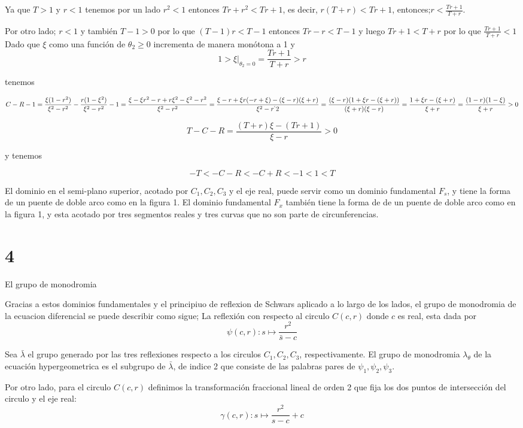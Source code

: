 \documentclass[11pt]{report}
\theoremstyle{definition}
\theoremstyle{remark}
\begin{document}
Ya que $T>1$ y $r <1$ tenemos por un lado $r^{2}<1$ entonces $Tr + r^{2} < Tr + 1$, es decir, $r(T+r)< Tr +1$, entonces;$r<\frac{Tr + 1}{T+r}$.

Por otro lado; $r<1$ y tambi\'en $T-1>0$ por lo que $(T-1)r < T-1$ entonces $Tr-r < T-1$ y luego $Tr +1 < T+r$ por lo que $\frac{Tr +1}{T +r} < 1$
Dado que $\xi $ como una funci\'on de $\theta_{2} \geq 0$ incrementa de manera mon\'otona a 1 y $$1 > \xi |_{\theta_{2} =0} = \frac{Tr+1}{T+r} > r $$

tenemos

$$C-R-1 =\frac{\xi(1-r^{2})}{\xi^{2}-r^{2}} - \frac{r(1-\xi^{2})}{\xi^{2}-r^{2}}-1= \frac{\xi-\xi r^{2} -r + r\xi^{2}-\xi^{2} - r^{2}}{\xi^{2} - r^{2}}= \frac{\xi-r + \xi r(-r + \xi)-(\xi -r)(\xi + r)}{ \xi^{2} - r^`{2}}= \frac{(\xi -r)(1 + \xi r - (\xi +r))}{(\xi +r)(\xi -r)}=\frac{1 + \xi r -(\xi +r)}{\xi +r}=\frac{(1-r)(1-\xi)}{\xi +r} > 0  $$

$$T-C-R =\frac{(T+r)\xi - (Tr +1)}{\xi -r} >0$$

y tenemos

$$-T < -C -R < -C + R < -1< 1< T $$

El dominio en el semi-plano superior, acotado por $C_{1}, C_{2}, C_{3}$ y el eje real, puede servir como un dominio fundamental $F_{s}$, y tiene la forma de un puente de doble arco como en la figura 1. El dominio fundamental $F_{x}$ tambi\'en tiene la forma de de un  puente de doble arco como en la figura 1, y esta acotado por tres segmentos reales y tres curvas que no son parte de circunferencias.

\section{4} El grupo de monodromia

Gracias a estos dominios fundamentales y el principiuo de reflexion de Schwars aplicado a lo largo de los lados, el grupo de monodromia de la ecuacion diferencial se puede describir como sigue; La reflexi\'on con respecto al circulo $C(c,r)$ donde $c$ es real, esta dada por  $$\psi(c,r): s \mapsto \frac{r^{2}}{\bar{s} - c}  $$

Sea $\bar{\lambda}$ el grupo generado por las tres reflexiones respecto a los circulos $C_{1},C_{2},C_{3}$, respectivamente. El grupo de monodromia $\lambda_{\theta}$ de la ecuaci\'on hypergeometrica es el subgrupo de $\bar{\lambda}$, de indice 2 que consiste de las palabras pares de $\psi_{1},\psi_{2}, \psi_{3}$.

Por otro lado, para el circulo $C(c,r)$ definimos la transformaci\'on fraccional lineal de orden 2 que fija los dos puntos de intersecci\'on del circulo y el eje real: $$\gamma (c,r): s \mapsto \frac{r^{2}}{s-c} + c $$
\end{document}
